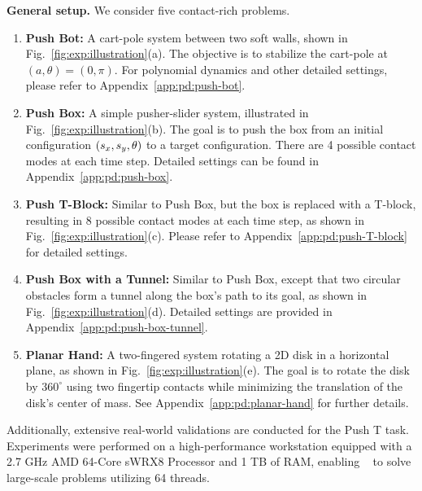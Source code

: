 \textbf{General setup.} We consider five contact-rich problems.  
\begin{enumerate}
    \item \textbf{Push Bot:} A cart-pole system between two soft walls, shown in Fig.~\ref{fig:exp:illustration}(a). The objective is to stabilize the cart-pole at $(a, \theta) = (0, \pi)$. For polynomial dynamics and other detailed settings, please refer to Appendix~\ref{app:pd:push-bot}.  

    \item \textbf{Push Box:} A simple pusher-slider system, illustrated in Fig.~\ref{fig:exp:illustration}(b). The goal is to push the box from an initial configuration $(\sx, \sy, \theta)$ to a target configuration. There are 4 possible contact modes at each time step. Detailed settings can be found in Appendix~\ref{app:pd:push-box}.  

    \item \textbf{Push T-Block:} Similar to Push Box, but the box is replaced with a T-block, resulting in 8 possible contact modes at each time step, as shown in Fig.~\ref{fig:exp:illustration}(c). Please refer to Appendix~\ref{app:pd:push-T-block} for detailed settings.  

    \item \textbf{Push Box with a Tunnel:} Similar to Push Box, except that two circular obstacles form a tunnel along the box's path to its goal, as shown in Fig.~\ref{fig:exp:illustration}(d). Detailed settings are provided in Appendix~\ref{app:pd:push-box-tunnel}.  

    \item \textbf{Planar Hand:} A two-fingered system rotating a 2D disk in a horizontal plane, as shown in Fig.~\ref{fig:exp:illustration}(e). The goal is to rotate the disk by $360^\circ$ using two fingertip contacts while minimizing the translation of the disk's center of mass. See Appendix~\ref{app:pd:planar-hand} for further details.  
\end{enumerate}  

Additionally, extensive real-world validations are conducted for the Push T task. Experiments were performed on a high-performance workstation equipped with a 2.7 GHz AMD 64-Core sWRX8 Processor and 1 TB of RAM, enabling \MOSEK~\cite{aps2019ugrm-mosek-sdpsolver} to solve large-scale problems utilizing 64 threads.  



% 
% 
% 
% 
% 

